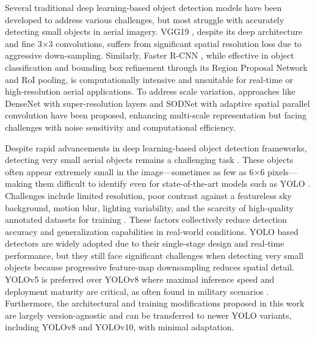 \documentclass[preprint,review,12pt]{elsarticle}
\begin{document}
Several traditional deep learning-based object detection models have been developed to address various challenges, but most struggle with accurately detecting small objects in aerial imagery. VGG19 \cite{simonyan2014very}, despite its deep architecture and fine 3×3 convolutions, suffers from significant spatial resolution loss due to aggressive down-sampling. Similarly, Faster R-CNN \cite{ren2016faster}, while effective in object classification and bounding box refinement through its Region Proposal Network and RoI pooling, is computationally intensive and unsuitable for real-time or high-resolution aerial applications. To address scale variation, approaches like DenseNet with super-resolution layers \cite{zhou2018scale} and SODNet \cite{qi2022small} with adaptive spatial parallel convolution have been proposed, enhancing multi-scale representation but facing challenges with noise sensitivity and computational efficiency.

Despite rapid advancements in deep learning-based object detection frameworks, detecting very small aerial objects remains a challenging task 
\cite{new_BAKIRCI2024112015,new_goswami}.
These objects often appear extremely small in the image—sometimes as few as 6×6 pixels—making them difficult to identify even for state-of-the-art models such as YOLO 
\cite{new_SARKAR2025113837,new_wang_yolo_airport}.
Challenges include limited resolution, poor contrast against a featureless sky background, motion blur, lighting variability, and the scarcity of high-quality annotated datasets for training \cite{new_heirarchy,new_LI2025113841}. These factors collectively reduce detection accuracy and generalization capabilities in real-world conditions. YOLO based detectors are widely adopted due to their single-stage design and real-time performance, but they still face significant challenges when detecting very small objects because progressive feature-map downsampling reduces spatial detail. YOLOv5 \cite{glenn_jocher_2020_4154370} is preferred over YOLOv8 \cite{yaseen2024yolov8,ultralytics_yolov8_2023} where maximal inference speed and deployment maturity are critical, as often found in military scenarios \cite{Bochkovskiy2021,liu2023military,Redmon2021}. Furthermore, the architectural and training modifications proposed in this work are largely version-agnostic and can be transferred to newer YOLO variants, including YOLOv8 and YOLOv10, with minimal adaptation.
\end{document}
